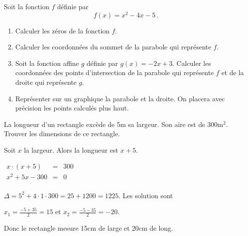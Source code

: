 \begin{exo}[title=Sans calculatrice]

Soit la fonction $f$ définie par $$f(x)=x^2-4x-5\,.$$

\begin{enumerate}
\item Calculer les zéros de la fonction $f$.

\item Calculer les coordonnées du sommet de la parabole qui représente $f$.

\item Soit la fonction affine $g$ définie par $g(x)=-2x+3$. Calculer les coordonnées des points d'intersection de la parabole qui représente $f$  et de la droite qui représente $g$.

\item Représenter sur un graphique la parabole et la droite. On placera avec précision les points calculés plus haut.
\end{enumerate}
\end{exo}
















\begin{exo}
 La longueur d'un rectangle excède de 5m sa largeur. Son aire est de 300m$^2$. Trouver les dimensions 
de ce rectangle.

\begin{sol*}
Soit $x$ la largeur. Alors 	la longueur est $x+5$.

$
\begin{array}{rcl}
x \cdot (x+5) &  = & 300 \\
x^2 +5x -300 & = & 0 \\
\end{array}
$

$\Delta = 5^2+4\cdot 1 \cdot 300 = 25+1200=1225$. Les solution sont \par 
$x_1 = \frac{-5+35}{2} =15$ et $x_2 = \frac{-5-35}{2}=-20$.

Donc le rectangle mesure 15cm de large et 20cm de long.

\end{sol*}
\end{exo}


